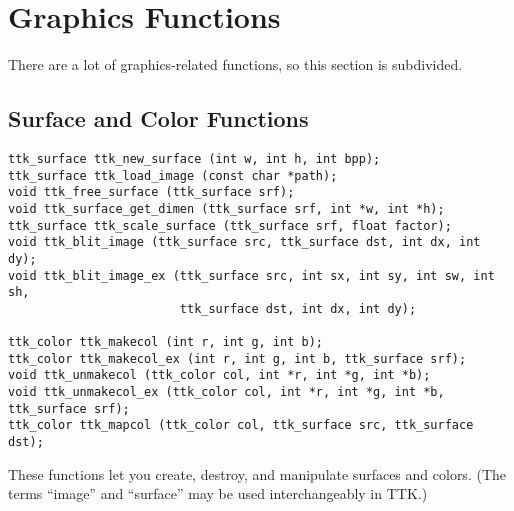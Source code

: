 \documentclass[12pt,letterpaper]{report}
\begin{document}
\section{Graphics Functions}
There are a lot of graphics-related functions, so this section is subdivided.

\subsection{Surface and Color Functions}
{\footnotesize\begin{verbatim}
ttk_surface ttk_new_surface (int w, int h, int bpp);
ttk_surface ttk_load_image (const char *path);
void ttk_free_surface (ttk_surface srf);
void ttk_surface_get_dimen (ttk_surface srf, int *w, int *h);
ttk_surface ttk_scale_surface (ttk_surface srf, float factor);
void ttk_blit_image (ttk_surface src, ttk_surface dst, int dx, int dy);
void ttk_blit_image_ex (ttk_surface src, int sx, int sy, int sw, int sh,
                        ttk_surface dst, int dx, int dy);

ttk_color ttk_makecol (int r, int g, int b);
ttk_color ttk_makecol_ex (int r, int g, int b, ttk_surface srf);
void ttk_unmakecol (ttk_color col, int *r, int *g, int *b);
void ttk_unmakecol_ex (ttk_color col, int *r, int *g, int *b, ttk_surface srf);
ttk_color ttk_mapcol (ttk_color col, ttk_surface src, ttk_surface dst);
\end{verbatim}
}

These functions let you create, destroy, and manipulate surfaces and colors.
(The terms ``image'' and ``surface'' may be used interchangeably in TTK.)
\end{document}
